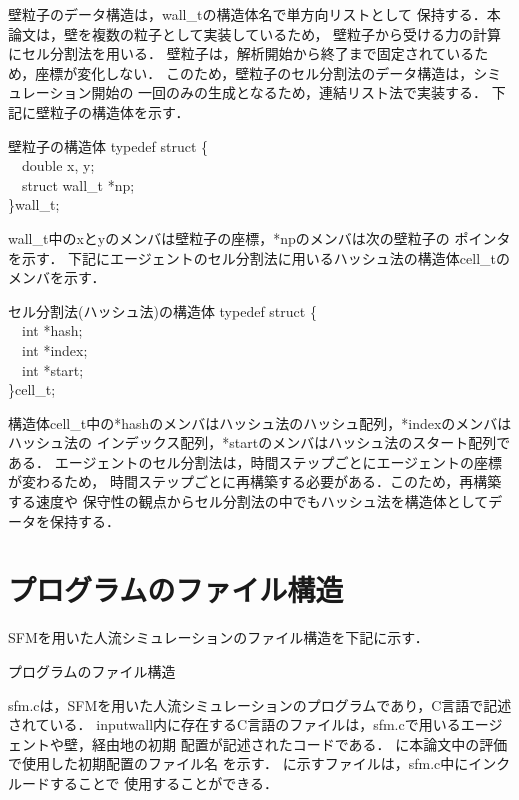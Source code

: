 壁粒子のデータ構造は，wall\_tの構造体名で単方向リストとして
保持する．本論文は，壁を複数の粒子として実装しているため，
壁粒子から受ける力の計算にセル分割法を用いる．
壁粒子は，解析開始から終了まで固定されているため，座標が変化しない．
このため，壁粒子のセル分割法のデータ構造は，シミュレーション開始の
一回のみの生成となるため，連結リスト法で実装する．
下記に壁粒子の構造体を示す．
%
\begin{itembox}[l]{壁粒子の構造体}
typedef struct \{\\
　double x, y;\\
　struct wall\_t *np;\\ 
\}wall\_t;
\end{itembox}
%
wall\_t中のxとyのメンバは壁粒子の座標，*npのメンバは次の壁粒子の
ポインタを示す．
下記にエージェントのセル分割法に用いるハッシュ法の構造体cell\_tの
メンバを示す．
\begin{itembox}[l]{セル分割法(ハッシュ法)の構造体}
typedef struct \{\\
　int *hash;\\
　int *index;\\
　int *start;\\
\}cell\_t;
\end{itembox}
構造体cell\_t中の*hashのメンバはハッシュ法のハッシュ配列，*indexのメンバはハッシュ法の
インデックス配列，*startのメンバはハッシュ法のスタート配列である．
エージェントのセル分割法は，時間ステップごとにエージェントの座標が変わるため，
時間ステップごとに再構築する必要がある．このため，再構築する速度や
保守性の観点からセル分割法の中でもハッシュ法を構造体としてデータを保持する．

\section{プログラムのファイル構造}
SFMを用いた人流シミュレーションのファイル構造を下記に示す．
%
\begin{itembox}[l]{プログラムのファイル構造}
\end{itembox}
%
sfm.cは，SFMを用いた人流シミュレーションのプログラムであり，C言語で記述されている．
inputwall内に存在するC言語のファイルは，sfm.cで用いるエージェントや壁，経由地の初期
配置が記述されたコードである．
に本論文中の評価で使用した初期配置のファイル名
を示す．
に示すファイルは，sfm.c中にインクルードすることで
使用することができる．

